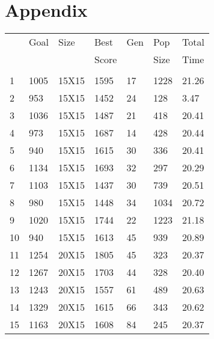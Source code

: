 \documentclass[14pt]{acmsiggraph}
\begin{document}
	\section{Appendix}
	\onecolumn
	\clearpage
	\begin{table}[h!]
		\footnotesize	
		\vspace{5pt}
		\begin{center}
			\subtable
			{
				\begin{tabular}{lllllll||}
					 & Goal   & Size   & Best & Gen & Pop & Total \\ 
					 &  &    & Score &   &  Size & Time \\ \hline
					 &  &   &  &   &   &  \\ 
					1   & 1005 & 15X15  & \cellcolor[rgb]{1,0.76,0.43}1595    & 17  & 1228 & 21.26 \\
					2   & 953  & 15X15  & \cellcolor[rgb]{1,0.87,0.49}1452    & 24  & 128  & 3.47  \\
					3   & 1036 & 15X15  & \cellcolor[rgb]{0.92,0.88,0.48}1487 & 21  & 418  & 20.41 \\
					4   & 973  & 15X15  & \cellcolor[rgb]{1,0.49,0.27}1687    & 14  & 428  & 20.44 \\
					5   & 940  & 15X15  & \cellcolor[rgb]{1,0.52,0.29}1615    & 30  & 336  & 20.41 \\
					6   & 1134 & 15X15  & \cellcolor[rgb]{0.98,0.91,0.51}1693 & 32  & 297  & 20.29 \\
					7   & 1103 & 15X15  & \cellcolor[rgb]{0.77,0.82,0.41}1437 & 30  & 739  & 20.51 \\
					8   & 980  & 15X15  & \cellcolor[rgb]{0.97,0.9,0.5}1448   & 34  & 1034 & 20.72 \\
					9   & 1020 & 15X15  & \cellcolor[rgb]{1,0.53,0.3}1744     & 22  & 1223 & 21.18 \\
					10  & 940  & 15X15  & \cellcolor[rgb]{1,0.52,0.29}1613    & 45  & 939  & 20.89 \\
					11  & 1254 & 20X15  & \cellcolor[rgb]{0.92,0.89,0.48}1805 & 45  & 323  & 20.37 \\
					12  & 1267 & 20X15  & \cellcolor[rgb]{0.82,0.84,0.43}1703 & 44  & 328  & 20.40 \\
					13  & 1243 & 20X15  & \cellcolor[rgb]{0.72,0.8,0.39}1557  & 61  & 489  & 20.63 \\
					14  & 1329 & 20X15  & \cellcolor[rgb]{0.67,0.78,0.38}1615 & 66  & 343  & 20.62 \\
					15  & 1163 & 20X15  & \cellcolor[rgb]{0.86,0.86,0.45}1608 & 84  & 245  & 20.37 \\

\end{tabular}}
\end{center}
\end{table}
\end{document}
